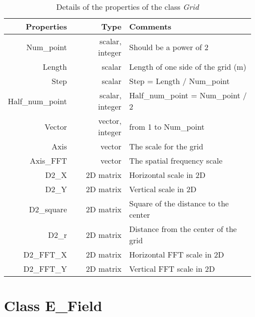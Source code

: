\begin{table}
  \centering
  \caption{\label{App3:grid} Details of the properties of the class \textsl{Grid} }
\begin{tabular}{|r r l|}
\hline
{\Large\strut} Properties & Type &  Comments \\
\hline
{\Large\strut} Num\_point &  scalar, integer & Should be a power of 2 \\
{\Large\strut} Length &  scalar & Length of one side of the grid (m)\\
{\Large\strut} Step &  scalar & Step = Length / Num\_point \\
{\Large\strut} Half\_num\_point &  scalar, integer & Half\_num\_point = Num\_point / 2 \\
{\Large\strut} Vector &  vector, integer & from 1 to Num\_point \\
{\Large\strut} Axis &  vector &  The scale for the grid \\
{\Large\strut} Axis\_FFT &  vector &  The spatial frequency scale\\
{\Large\strut} D2\_X &  2D matrix &  Horizontal scale in 2D \\
{\Large\strut} D2\_Y &  2D matrix &  Vertical scale in 2D \\
{\Large\strut} D2\_square &  2D matrix & Square of the distance to the center \\
{\Large\strut} D2\_r &  2D matrix & Distance from the center of the grid \\
{\Large\strut} D2\_FFT\_X &  2D matrix & Horizontal FFT scale in 2D \\
{\Large\strut} D2\_FFT\_Y &  2D matrix & Vertical FFT scale in 2D \\
\hline
\end{tabular}
\end{table}



\section{Class E\_Field}

